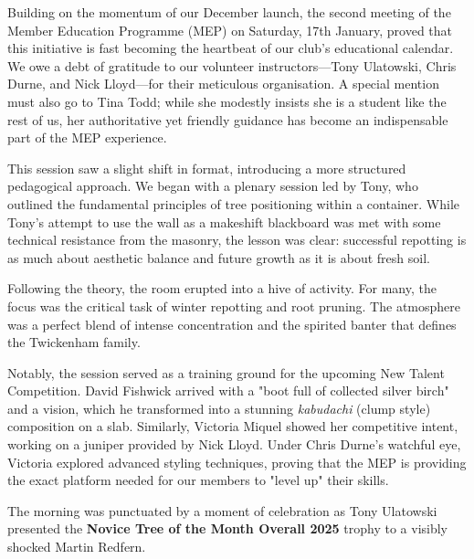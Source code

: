 \label{2026-01-workshop-mep}

\noindent
Building on the momentum of our December launch, the second meeting of the Member Education Programme (MEP) on Saturday, 17th January, proved that this initiative is fast becoming the heartbeat of our club’s educational calendar.
We owe a debt of gratitude to our volunteer instructors—Tony Ulatowski, Chris Durne, and Nick Lloyd—for their meticulous organisation.
A special mention must also go to Tina Todd; while she modestly insists she is a student like the rest of us, her authoritative yet friendly guidance has become an indispensable part of the MEP experience.

This session saw a slight shift in format, introducing a more structured pedagogical approach.
We began with a plenary session led by Tony, who outlined the fundamental principles of tree positioning within a container.
While Tony’s attempt to use the wall as a makeshift blackboard was met with some technical resistance from the masonry, the lesson was clear: successful repotting is as much about aesthetic balance and future growth as it is about fresh soil.

\medskip
{}
\noindent
Following the theory, the room erupted into a hive of activity.
For many, the focus was the critical task of winter repotting and root pruning.
The atmosphere was a perfect blend of intense concentration and the spirited banter that defines the Twickenham family.

Notably, the session served as a training ground for the upcoming New Talent Competition.
David Fishwick arrived with a "boot full of collected silver birch" and a vision, which he transformed into a stunning \textit{kabudachi} (clump style) composition on a slab.
Similarly, Victoria Miquel showed her competitive intent, working on a juniper provided by Nick Lloyd.
Under Chris Durne’s watchful eye, Victoria explored advanced styling techniques, proving that the MEP is providing the exact platform needed for our members to "level up" their skills.

\noindent
The morning was punctuated by a moment of celebration as Tony Ulatowski presented the \textbf{Novice Tree of the Month Overall 2025} trophy to a visibly shocked Martin Redfern.


